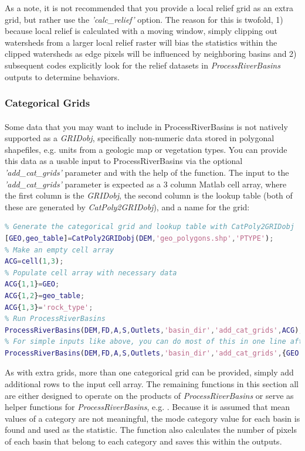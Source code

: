 \noindent
As a note, it is not recommended that you provide a local relief grid as an extra grid, but rather use the \textit{'calc\_relief'} option. The reason for this is twofold, 1) because local relief is calculated with a moving window, simply clipping out watersheds from a larger local relief raster will bias the statistics within the clipped watersheds as edge pixels will be influenced by neighboring basins and 2) subsequent codes explicitly look for the relief datasets in \textit{ProcessRiverBasins} outputs to determine behaviors.

\subsubsection{Categorical Grids} \label{sec:PRB_ACG}
\paragraph{}Some data that you may want to include in ProcessRiverBasins is not natively supported as a \textit{GRIDobj}, specifically non-numeric data stored in polygonal shapefiles, e.g. units from a geologic map or vegetation types. You can provide this data as a usable input to ProcessRiverBasins via the optional \textit{'add\_cat\_grids'} parameter and with the help of the  function. The input to the \textit{'add\_cat\_grids'} parameter is expected as a 3 column Matlab cell array, where the first column is the \textit{GRIDobj}, the second column is the lookup table (both of these are generated by \textit{CatPoly2GRIDobj}), and a name for the grid:

\begin{lstlisting}[language=Matlab]
% To run ProcessRiverBasins an additional categorical grid
% Generate the categorical grid and lookup table with CatPoly2GRIDobj
[GEO,geo_table]=CatPoly2GRIDobj(DEM,'geo_polygons.shp','PTYPE');
% Make an empty cell array
ACG=cell(1,3);
% Populate cell array with necessary data
ACG{1,1}=GEO;
ACG{1,2}=geo_table;
ACG{1,3}='rock_type';
% Run ProcessRiverBasins
ProcessRiverBasins(DEM,FD,A,S,Outlets,'basin_dir','add_cat_grids',ACG);
% For simple inputs like above, you can do most of this in one line after generating GEO and geo_table with CatPoly2GRIDobj
ProcessRiverBasins(DEM,FD,A,S,Outlets,'basin_dir','add_cat_grids',{GEO geo_table 'geology'});
\end{lstlisting}

\noindent
As with extra grids, more than one categorical grid can be provided, simply add additional rows to the input cell array. The remaining functions in this section all are either designed to operate on the products of \textit{ProcessRiverBasins} or serve as helper functions for \textit{ProcessRiverBasins}, e.g. . Because it is assumed that mean values of a category are not meaningful, the mode category value for each basin is found and used as the statistic. The function also calculates the number of pixels of each basin that belong to each category and saves this within the outputs.


